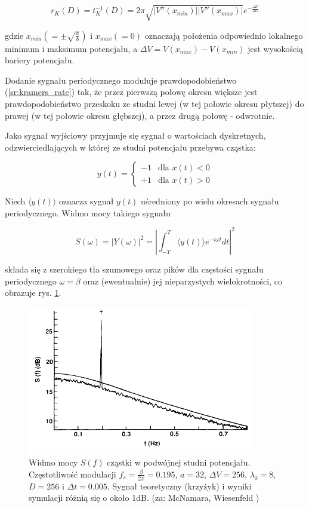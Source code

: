   \begin{equation} \label{sr:kramers_rate}
    r_K (D) = t^{-1}_K (D) =  2 \pi \sqrt{|V''(x_{min})| |V''(x_{max})|} e^{-\frac{\Delta V}{2D}}
  \end{equation}

  gdzie $x_{min} (= \pm \sqrt{\frac{a}{b}})$ i $x_{max} (=0)$ oznaczają położenia odpowiednio lokalnego minimum i maksimum potencjału, a $\Delta V = V(x_{max}) - V(x_{min})$ jest wysokością bariery potencjału.

  Dodanie sygnału periodycznego moduluje prawdopodobieństwo (\ref{sr:kramers_rate}) tak, że przez pierwszą połowę okresu większe jest prawdopodobieństwo przeskoku ze studni lewej (w tej połowie okresu płytszej) do prawej (w tej połowie okresu głębszej), a przez drugą połowę - odwrotnie.

  Jako sygnał wyjściowy przyjmuje się sygnał o wartościach dyskretnych, odzwierciedlających w której ze studni potencjału przebywa cząstka:

    \begin{equation}
    y(t) = 
    \begin{cases}
      -1 & \text{dla } x(t) < 0 \\
      +1 & \text{dla } x(t) > 0 
    \end{cases}
  \end{equation}

  Niech $\langle y(t) \rangle$ oznacza sygnał $y(t)$ uśredniony po wielu okresach sygnału periodycznego. Widmo mocy takiego sygnału

  \begin{equation} \label{sr:power_spectrum}
    S(\omega) = |Y(\omega)|^2 = |\int_{-T}^T \langle y(t) \rangle e^{-i \omega t} dt |^2
  \end{equation}

  składa się z szerokiego tła szumowego oraz pików dla częstości sygnału periodycznego $\omega = \beta$ oraz (ewentualnie) jej nieparzystych wielokrotności, co obrazuje rys. \ref{fig:graphics:mcnamara8}.

  \begin{figure}
    \includegraphics[width=100mm]{images/mcnamara_8.png}
    \caption{Widmo mocy $S(f)$ cząstki w podwójnej studni potencjału. Częstotliwość modulacji $f_s = \frac{\beta}{2 \pi} = 0.195$, $a=32$, $\Delta V = 256$, $\lambda_0 = 8$, $D = 256$ i $\Delta t = 0.005$. Sygnał teoretyczny (krzyżyk) i wyniki symulacji różnią się o około 1dB. (za: McNamara, Wiesenfeld \cite{mcnamara})}
    \label{fig:graphics:mcnamara8}
  \end{figure}

